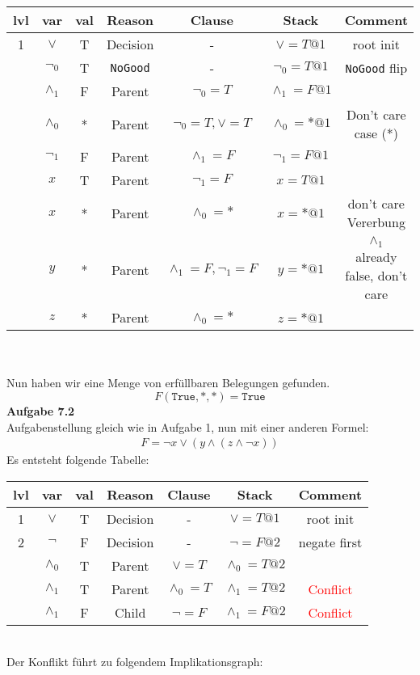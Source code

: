 \documentclass[a4paper,10pt]{article}
\begin{document}
\begin{tabular}{|c|c|c|c|c|c|c|}
	\hline 
	lvl & var & val & Reason & Clause & Stack & Comment \\ 
	\hline 
	1 & $\vee$ & T & Decision & - & $\vee=T@1$ & root init \\ 
	\hline 
	 & $\neg_0$ & T & \texttt{NoGood} & - & $\neg_0=T@1$ & \texttt{NoGood} flip\\ 
	\hline 
	& $\wedge_1$ & F & Parent & $\neg_0=T$ & $\wedge_1=F@1$ &  \\ 
	\hline 
	& $\wedge_0$ & * & Parent & $\neg_0=T,\vee = T$ & $\wedge_0=*@1$ & Don't care case (*) \\ 
	\hline 
	& $\neg_1$ & F & Parent & $\wedge_1=F$ & $\neg_1=F@1$ &  \\ 
	\hline 
	& $x$ & T & Parent & $\neg_1=F$ & $x=T@1$ &  \\ 
	\hline 
	& $x$ & * & Parent & $\wedge_0=*$ & $x=*@1$ & don't care Vererbung\\ 
	\hline
	&$y$&*&Parent&$\wedge_1=F,\neg_1=F$&$y=*@1$& $\wedge_1$ already false, don't care\\
	\hline
	&$z$&*&Parent&$\wedge_0=*$&$z=*@1$& \\
	\hline
\end{tabular}\\\\Nun haben wir eine Menge von erfüllbaren Belegungen gefunden.$$F(\texttt{True},*,*) = \texttt{True}$$
\newpage
\noindent\textbf{Aufgabe 7.2}\\
Aufgabenstellung gleich wie in Aufgabe 1, nun mit einer anderen Formel:
\begin{align*}
F = \neg x \vee (y \wedge (z \wedge \neg x))
\end{align*}
Es entsteht folgende Tabelle:\\

\begin{tabular}{|c|c|c|c|c|c|c|}
	\hline 
	lvl & var & val & Reason & Clause & Stack & Comment \\ 
	\hline \hline
	1 & $\vee$ & T & Decision & - & $\vee=T@1$ & root init \\ 
	\hline 
	2 & $\neg$ & F & Decision & - & $\neg=F@2$ & negate first \\ 
	\hline 
	& $\wedge_0$ & T & Parent & $\vee = T$ & $\wedge_0=T@2$ &  \\ 
	\hline 
	& $\wedge_1$ & T & Parent & $\wedge_0=T$ & $\wedge_1=T@2$ & \textcolor{red}{Conflict} \\ 
	\hline 
	& $\wedge_1$ & F & Child & $\neg = F$ & $\wedge_1=F@2$ & \textcolor{red}{Conflict} \\ 
	\hline 
\end{tabular}\\
Der Konflikt führt zu folgendem Implikationsgraph:
\end{document}
